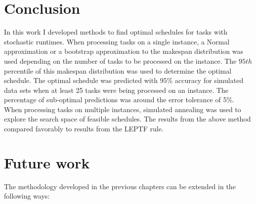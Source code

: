 \documentclass[12pt]{report}
\begin{document}
\section{Conclusion}

In this work I developed methods to find optimal schedules for tasks with stochastic runtimes. 
When processing tasks on a single instance, a Normal approximation or a bootstrap approximation to the makespan distribution was used depending on the number of tasks to be processed on the instance.
The $95th$ percentile of this makespan distribution was used to determine the optimal schedule.
The optimal schedule was predicted with 95\% accuracy for simulated data sets when at least 25 tasks were being processed on an instance. 
The percentage of sub-optimal predictions was around the error tolerance of 5\%. 
When processing tasks on multiple instances, simulated annealing was used to explore the search space of feasible schedules.
The results from the above method compared favorably to results from the LEPTF rule.

\section{Future work}

The methodology developed in the previous chapters can be extended in the following ways:
\end{document}
